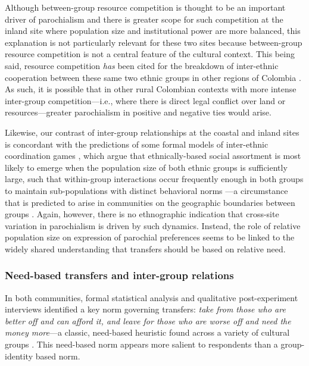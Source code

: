 \documentclass[bibauthoryear]{aa}
\begin{document}
Although between-group resource competition is thought to be an important driver of parochialism  \citep{bellmoya} and there is greater scope for such competition at the inland site where population size and institutional power are more balanced, this explanation is not particularly relevant for these two sites because between-group resource competition is not a central feature of the cultural context. This being said, resource competition \textit{has} been cited for the breakdown of inter-ethnic cooperation between these same two ethnic groups in other regions of Colombia \citep[e.g.,][]{ng2000titling, davis2002indigenous, garcia2009diversos, velasco2011contested}. As such, it is possible that in other rural Colombian contexts with more intense inter-group competition---i.e., where there is direct legal conflict over land or resources---greater parochialism in positive and negative ties would arise.

Likewise, our contrast of inter-group relationships at the coastal and inland sites is concordant with the predictions of some formal models of inter-ethnic coordination games \citep[e.g.,][]{mcelreath2003shared, advani2015melting}, which argue that ethnically-based social assortment is most likely to emerge when the population size of both ethnic groups is sufficiently large, such that within-group interactions occur frequently enough in both groups to maintain sub-populations with distinct behavioral norms \citep{bunce2017interethnic, bunce2018sustainability}---a circumstance that is predicted to arise in communities on the geographic boundaries between groups \citep{mcelreath2003shared}. Again, however, there is no ethnographic indication that cross-site variation in parochialism is driven by such dynamics. Instead, the role of relative population size on expression of parochial preferences seems to be linked to the widely shared understanding that transfers should be based on relative need.




\subsubsection{Need-based transfers and inter-group relations}\label{discneed}

In both communities, formal statistical analysis and qualitative post-experiment interviews identified a key norm governing transfers:
 \textit{take from those who are better off and can afford it, and leave for those who are worse off and need the money more}---a classic, need-based heuristic found across a variety of cultural groups
\citep[e.g., ][]{peterson1993demand, hooper2015inclusive, aktipis2016cooperation, hao2015need, gervais2017rich, cronk2019managing}. This need-based norm appears more salient to respondents than a group-identity based norm. %
\end{document}
